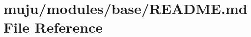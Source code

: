 \hypertarget{modules_2base_2_r_e_a_d_m_e_8md}{}\section{muju/modules/base/\+R\+E\+A\+D\+ME.md File Reference}
\label{modules_2base_2_r_e_a_d_m_e_8md}
